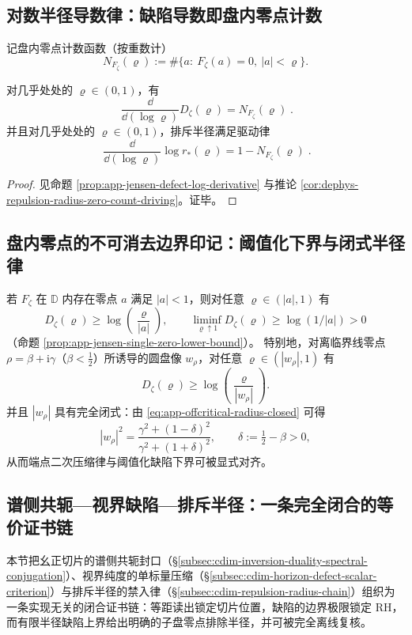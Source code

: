 \subsection{对数半径导数律：缺陷导数即盘内零点计数}\label{subsec:cdim-defect-log-derivative}
记盘内零点计数函数（按重数计）
\[
N_{F_{\zeta}}(\varrho):=\#\{a:\ F_{\zeta}(a)=0,\ |a|<\varrho\}.
\]

\begin{proposition}[对数半径导数律与驱动律]\label{prop:cdim-jensen-defect-log-derivative}
对几乎处处的 \(\varrho\in(0,1)\)，有
\[
\boxed{\;
\frac{\dd}{\dd(\log\varrho)}D_{\zeta}(\varrho)=N_{F_{\zeta}}(\varrho)\; }.
\]
并且对几乎处处的 \(\varrho\in(0,1)\)，排斥半径满足驱动律
\[
\boxed{\;
\frac{\dd}{\dd(\log\varrho)}\log r_{\ast}(\varrho)=1-N_{F_{\zeta}}(\varrho)\; }.
\]
\end{proposition}
\begin{proof}
见命题 \ref{prop:app-jensen-defect-log-derivative} 与推论 \ref{cor:dephys-repulsion-radius-zero-count-driving}。证毕。
\end{proof}

\subsection{盘内零点的不可消去边界印记：阈值化下界与闭式半径律}\label{subsec:cdim-jensen-single-zero-imprint}
若 \(F_{\zeta}\) 在 \(\mathbb{D}\) 内存在零点 \(a\) 满足 \(|a|<1\)，则对任意 \(\varrho\in(|a|,1)\) 有
\[
D_{\zeta}(\varrho)\ge \log\!\left(\frac{\varrho}{|a|}\right),
\qquad
\liminf_{\varrho\uparrow 1}D_{\zeta}(\varrho)\ge \log(1/|a|)>0
\]
（命题 \ref{prop:app-jensen-single-zero-lower-bound}）。
特别地，对离临界线零点 \(\rho=\beta+\mathrm{i}\gamma\)（\(\beta<\tfrac12\)）所诱导的圆盘像 \(w_{\rho}\)，对任意 \(\varrho\in(|w_{\rho}|,1)\) 有
\[
D_{\zeta}(\varrho)\ge \log\!\left(\frac{\varrho}{|w_{\rho}|}\right).
\]
并且 \(|w_{\rho}|\) 具有完全闭式：由 \eqref{eq:app-offcritical-radius-closed} 可得
\[
|w_{\rho}|^{2}=\frac{\gamma^{2}+(1-\delta)^{2}}{\gamma^{2}+(1+\delta)^{2}},
\qquad
\delta:=\tfrac12-\beta>0,
\]
从而端点二次压缩律与阈值化缺陷下界可被显式对齐。

\subsection{谱侧共轭—视界缺陷—排斥半径：一条完全闭合的等价证书链}\label{subsec:cdim-spectral-conjugation-horizon-defect-repulsion-chain}
本节把幺正切片的谱侧共轭封口（\S\ref{subsec:cdim-inversion-duality-spectral-conjugation}）、视界纯度的单标量压缩（\S\ref{subsec:cdim-horizon-defect-scalar-criterion}）与排斥半径的禁入律（\S\ref{subsec:cdim-repulsion-radius-chain}）组织为一条实现无关的闭合证书链：等距读出锁定切片位置，缺陷的边界极限锁定 RH，而有限半径缺陷上界给出明确的子盘零点排除半径，并可被完全离线复核。

